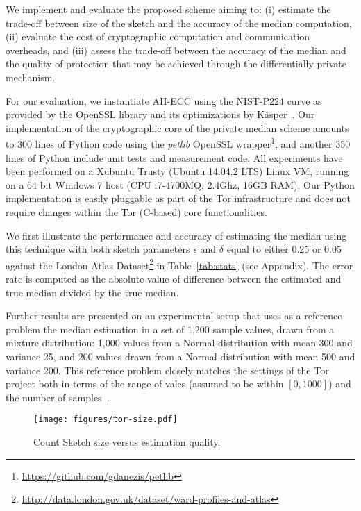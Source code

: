 \documentclass[conference]{IEEEtran}
\begin{document}
We implement and evaluate the proposed scheme aiming to: (i) estimate the trade-off between size of the sketch and the accuracy of the median computation, (ii) evaluate the cost of cryptographic computation and communication overheads, and (iii) assess the trade-off between the accuracy of the median and the quality of protection that may be achieved through the differentially private mechanism.

For our evaluation, we instantiate AH-ECC using the NIST-P224 curve as provided by the OpenSSL library and its optimizations by K{\"a}sper~\cite{kasper2012fast}. Our implementation of the cryptographic core of the private median scheme amounts to 300 lines of Python code using the \emph{petlib} OpenSSL wrapper\footnote{\url{https://github.com/gdanezis/petlib}}, and another 350 lines of Python include unit tests and measurement code. All experiments have been performed on a Xubuntu Trusty (Ubuntu 14.04.2 LTS) Linux VM, running on a 64 bit Windows 7 host (CPU i7-4700MQ, 2.4Ghz, 16GB RAM).
Our Python implementation is easily pluggable as part of the Tor infrastructure and does not require changes within the Tor (C-based) core functionalities.

We first illustrate the performance and accuracy of estimating the median using this technique with both sketch parameters $\epsilon$ and $\delta$ equal to either 0.25 or 0.05 against the London Atlas Dataset\footnote{\url{http://data.london.gov.uk/dataset/ward-profiles-and-atlas}} in Table~\ref{tab:stats} (see Appendix). The error rate is computed as the absolute value of difference between the estimated and true median divided by the true median.

Further results are presented on an experimental setup that uses as a reference problem the median estimation in a set of 1,200 sample values, drawn from a mixture distribution: 1,000 values from a Normal distribution with mean 300 and variance 25, and 200 values drawn from a Normal distribution with mean 500 and variance 200. This reference problem closely matches the settings of the Tor project both in terms of the range of vales (assumed to be within $[0, 1000]$) and the number of samples~\cite{elahi2014privex}.

\begin{figure}[t]
\centering
\texttt{[image: figures/tor-size.pdf]}
\vspace{-0.2cm}
\caption{\label{fig:tor-sizes} Count Sketch size versus estimation quality.}
\vspace{-0.2cm}
\end{figure}
\end{document}
